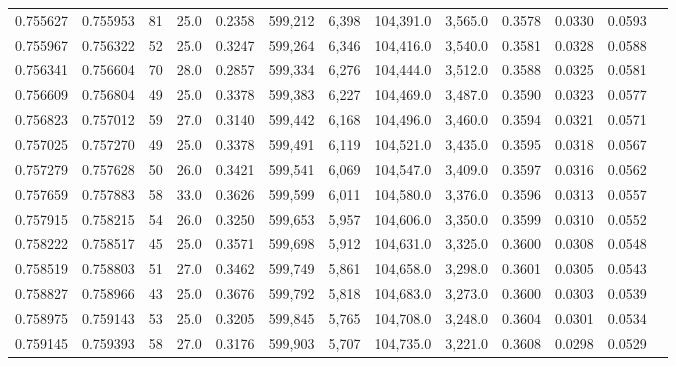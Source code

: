 \begin{tabular}{rrrrrrrrrrrrr}
0.755627 & 0.755953 &    81 & 25.0 &                                     0.2358 & 599,212 &   6,398 & 104,391.0 &   3,565.0 & 0.3578 & 0.0330 & 0.0593 \\
0.755967 & 0.756322 &    52 & 25.0 &                                     0.3247 & 599,264 &   6,346 & 104,416.0 &   3,540.0 & 0.3581 & 0.0328 & 0.0588 \\
0.756341 & 0.756604 &    70 & 28.0 &                                     0.2857 & 599,334 &   6,276 & 104,444.0 &   3,512.0 & 0.3588 & 0.0325 & 0.0581 \\
0.756609 & 0.756804 &    49 & 25.0 &                                     0.3378 & 599,383 &   6,227 & 104,469.0 &   3,487.0 & 0.3590 & 0.0323 & 0.0577 \\
0.756823 & 0.757012 &    59 & 27.0 &                                     0.3140 & 599,442 &   6,168 & 104,496.0 &   3,460.0 & 0.3594 & 0.0321 & 0.0571 \\
0.757025 & 0.757270 &    49 & 25.0 &                                     0.3378 & 599,491 &   6,119 & 104,521.0 &   3,435.0 & 0.3595 & 0.0318 & 0.0567 \\
0.757279 & 0.757628 &    50 & 26.0 &                                     0.3421 & 599,541 &   6,069 & 104,547.0 &   3,409.0 & 0.3597 & 0.0316 & 0.0562 \\
0.757659 & 0.757883 &    58 & 33.0 &                                     0.3626 & 599,599 &   6,011 & 104,580.0 &   3,376.0 & 0.3596 & 0.0313 & 0.0557 \\
0.757915 & 0.758215 &    54 & 26.0 &                                     0.3250 & 599,653 &   5,957 & 104,606.0 &   3,350.0 & 0.3599 & 0.0310 & 0.0552 \\
0.758222 & 0.758517 &    45 & 25.0 &                                     0.3571 & 599,698 &   5,912 & 104,631.0 &   3,325.0 & 0.3600 & 0.0308 & 0.0548 \\
0.758519 & 0.758803 &    51 & 27.0 &                                     0.3462 & 599,749 &   5,861 & 104,658.0 &   3,298.0 & 0.3601 & 0.0305 & 0.0543 \\
0.758827 & 0.758966 &    43 & 25.0 &                                     0.3676 & 599,792 &   5,818 & 104,683.0 &   3,273.0 & 0.3600 & 0.0303 & 0.0539 \\
0.758975 & 0.759143 &    53 & 25.0 &                                     0.3205 & 599,845 &   5,765 & 104,708.0 &   3,248.0 & 0.3604 & 0.0301 & 0.0534 \\
0.759145 & 0.759393 &    58 & 27.0 &                                     0.3176 & 599,903 &   5,707 & 104,735.0 &   3,221.0 & 0.3608 & 0.0298 & 0.0529 \\

\end{tabular}
